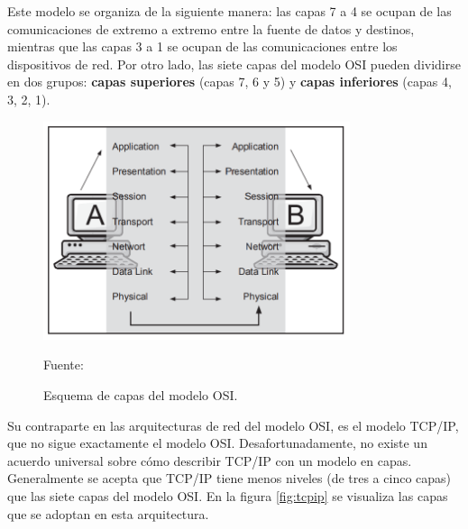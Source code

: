 Este modelo se organiza de la siguiente manera: las capas 7 a 4 se ocupan de las comunicaciones de extremo a extremo entre la fuente de datos y destinos, mientras que las capas 3 a 1 se ocupan de las comunicaciones entre los dispositivos de red. Por otro lado, las siete capas del modelo OSI pueden dividirse en dos grupos: \textbf{capas superiores} (capas 7, 6 y 5) y \textbf{capas inferiores} (capas 4, 3, 2, 1).\\

\begin{figure}[H]
    \begin{center}
        \includegraphics[width=9cm]{img/capitulo_2/capas.png}
    \end{center}
    \begin{center}
        \caption{Esquema de capas del modelo OSI.}
        Fuente: \protect\cite[3]{networkProtocolos:handbook}
        \label{fig:osi}
    \end{center}
\end{figure}

Su contraparte en las arquitecturas de red del modelo OSI, es el modelo TCP/IP, que no sigue exactamente el modelo OSI. Desafortunadamente, no existe un acuerdo universal sobre cómo describir TCP/IP con un modelo en capas. Generalmente se acepta que TCP/IP tiene menos niveles (de tres a cinco capas) que las siete capas del modelo OSI. En la figura \ref{fig:tcpip} se visualiza las capas que se adoptan en esta arquitectura.\\


